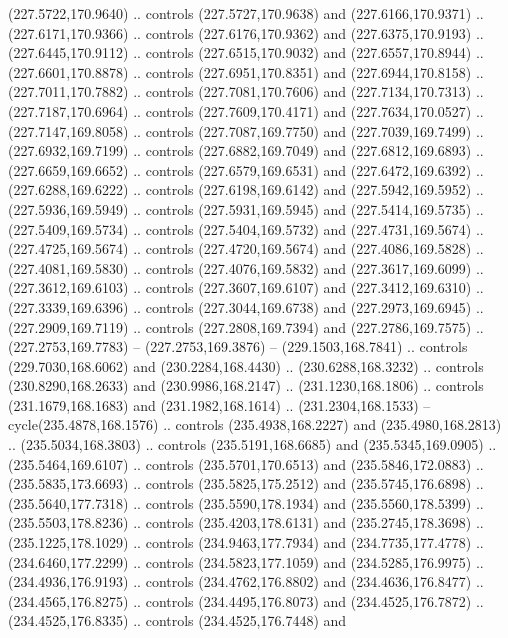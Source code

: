 \begin{scope}[cm={{1.25,0.0,0.0,-1.25,(0.0,442.91375)}}]
    (227.5722,170.9640) .. controls (227.5727,170.9638) and (227.6166,170.9371) ..
    (227.6171,170.9366) .. controls (227.6176,170.9362) and (227.6375,170.9193) ..
    (227.6445,170.9112) .. controls (227.6515,170.9032) and (227.6557,170.8944) ..
    (227.6601,170.8878) .. controls (227.6951,170.8351) and (227.6944,170.8158) ..
    (227.7011,170.7882) .. controls (227.7081,170.7606) and (227.7134,170.7313) ..
    (227.7187,170.6964) .. controls (227.7609,170.4171) and (227.7634,170.0527) ..
    (227.7147,169.8058) .. controls (227.7087,169.7750) and (227.7039,169.7499) ..
    (227.6932,169.7199) .. controls (227.6882,169.7049) and (227.6812,169.6893) ..
    (227.6659,169.6652) .. controls (227.6579,169.6531) and (227.6472,169.6392) ..
    (227.6288,169.6222) .. controls (227.6198,169.6142) and (227.5942,169.5952) ..
    (227.5936,169.5949) .. controls (227.5931,169.5945) and (227.5414,169.5735) ..
    (227.5409,169.5734) .. controls (227.5404,169.5732) and (227.4731,169.5674) ..
    (227.4725,169.5674) .. controls (227.4720,169.5674) and (227.4086,169.5828) ..
    (227.4081,169.5830) .. controls (227.4076,169.5832) and (227.3617,169.6099) ..
    (227.3612,169.6103) .. controls (227.3607,169.6107) and (227.3412,169.6310) ..
    (227.3339,169.6396) .. controls (227.3044,169.6738) and (227.2973,169.6945) ..
    (227.2909,169.7119) .. controls (227.2808,169.7394) and (227.2786,169.7575) ..
    (227.2753,169.7783) -- (227.2753,169.3876) -- (229.1503,168.7841) .. controls
    (229.7030,168.6062) and (230.2284,168.4430) .. (230.6288,168.3232) .. controls
    (230.8290,168.2633) and (230.9986,168.2147) .. (231.1230,168.1806) .. controls
    (231.1679,168.1683) and (231.1982,168.1614) .. (231.2304,168.1533) --
    cycle(235.4878,168.1576) .. controls (235.4938,168.2227) and
    (235.4980,168.2813) .. (235.5034,168.3803) .. controls (235.5191,168.6685) and
    (235.5345,169.0905) .. (235.5464,169.6107) .. controls (235.5701,170.6513) and
    (235.5846,172.0883) .. (235.5835,173.6693) .. controls (235.5825,175.2512) and
    (235.5745,176.6898) .. (235.5640,177.7318) .. controls (235.5590,178.1934) and
    (235.5560,178.5399) .. (235.5503,178.8236) .. controls (235.4203,178.6131) and
    (235.2745,178.3698) .. (235.1225,178.1029) .. controls (234.9463,177.7934) and
    (234.7735,177.4778) .. (234.6460,177.2299) .. controls (234.5823,177.1059) and
    (234.5285,176.9975) .. (234.4936,176.9193) .. controls (234.4762,176.8802) and
    (234.4636,176.8477) .. (234.4565,176.8275) .. controls (234.4495,176.8073) and
    (234.4525,176.7872) .. (234.4525,176.8335) .. controls (234.4525,176.7448) and

\end{scope}
